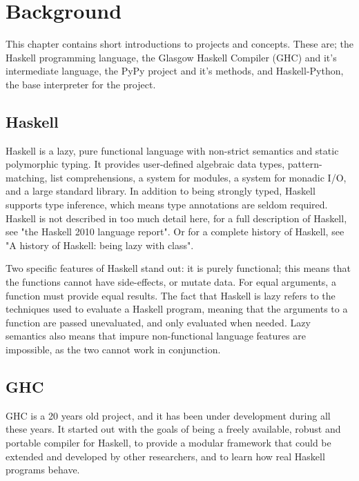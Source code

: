 
\chapter{Background}
\label{chap:back}

This chapter contains short introductions to projects and concepts. These are;
the Haskell programming language,
the Glasgow Haskell Compiler (GHC) and it's intermediate language,
the PyPy project and it's methods,
and Haskell-Python, the base interpreter for the project.

\section{Haskell}

Haskell is a lazy, pure functional language with non-strict semantics and static 
polymorphic typing. It provides user-defined algebraic data types, pattern-matching, 
list comprehensions, a system for modules, a system for monadic I/O, and a large 
standard library. In addition to being strongly typed, Haskell supports type
inference, which means type annotations are seldom required. Haskell is not described
in too much detail here, for a full description 
of Haskell, see "the Haskell 2010 language report"\cite{marlow2010haskell}. 
Or for a complete history of Haskell, see "A history of Haskell: being lazy 
with class"\cite{hudak2007history}.

Two specific features
of Haskell stand out: it is purely functional; this means that the functions 
cannot have side-effects, or mutate data. For equal arguments, a function 
must provide equal results. The fact that Haskell is lazy refers to the techniques
used to evaluate a Haskell program, meaning that the arguments to a function are passed
unevaluated, and only evaluated when needed. Lazy semantics also means that impure 
non-functional language features are impossible, as the two cannot work in conjunction.
\cite{marlow2010haskell, marlow2012glasgow}

\section{GHC}

GHC is a 20 years old project, and it has been under development during
all these years. It started out with the goals of being a freely available,
robust and portable compiler for Haskell, to provide a modular framework that
could be extended and developed by other researchers, and to learn how real
Haskell programs behave. \cite{marlow2012glasgow}

